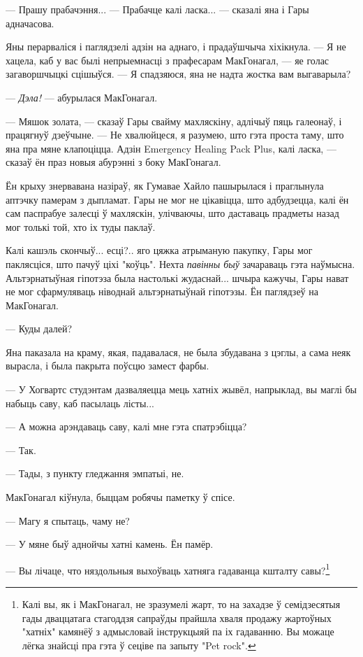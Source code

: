 --- Прашу прабачэння... --- Прабачце калі ласка... --- сказалі яна і Гары адначасова. 

Яны перарваліся і паглядзелі адзін на аднаго, і прадаўшчыча хіхікнула. --- Я
не хацела, каб у вас былі непрыемнасці з прафесарам МакГонагал, --- яе голас
загаворшчыцкі сцішыўся. --- Я спадзяюся, яна не надта жостка вам выгаварыла?

--- \emph{Дэла!} --- абурылася МакГонагал.

--- Мяшок золата, --- сказаў Гары свайму махляскіну, адлічыў пяць галеонаў, і 
працягнуў дзеўчыне. --- Не хвалюйцеся, я разумею, што гэта проста таму, што яна
пра мяне клапоціцца. Адзін Emergency Healing Pack Plus, калі ласка, --- сказаў ён праз новыя абурэнні
з боку МакГонагал.

Ён крыху знервавана назіраў, як Гумавае Хайло пашырылася і праглынула аптэчку
памерам з дыпламат. Гары не мог не цікавіцца, што адбудзецца, калі ён сам
паспрабуе залесці ў махляскін, улічваючы, што даставаць прадметы назад мог 
толькі той, хто іх туды паклаў. 

Калі кашэль скончыў... есці?.. яго цяжка атрыманую пакупку, Гары мог 
паклясціся, што пачуў ціхі "коўць". Нехта \emph{павінны быў} зачараваць гэта
наўмысна. Альтэрнатыўная гіпотэза была настолькі жудаснай... шчыра кажучы, Гары
нават не мог сфармуляваць ніводнай альтэрнатыўнай гіпотэзы. Ён паглядзеў на
МакГонагал.

--- Куды далей?

Яна паказала на краму, якая, падавалася, не была збудавана з цэглы, а сама неяк
вырасла, і была пакрыта поўсцю замест фарбы. 

--- У Хогвартс студэнтам дазваляецца мець хатніх жывёл, напрыклад, вы маглі бы
набыць саву, каб пасылаць лісты...

--- А можна арэндаваць саву, калі мне гэта спатрэбіцца?

--- Так.

--- Тады, з пункту гледжання эмпатыі, не.

МакГонагал кіўнула, быццам робячы паметку ў спісе.

--- Магу я спытаць, чаму не?

--- У мяне быў аднойчы хатні камень. Ён памёр.

--- Вы лічаце, что няздольныя выхоўваць хатняга гадаванца кшталту савы?\footnote{{}Калі вы, як і МакГонагал, 
не зразумелі жарт, то на захадзе ў 
семідзесятыя гады дваццатага стагоддзя сапраўды прайшла хваля продажу жартоўных 
"хатніх" камянёў з адмысловай інструкцыяй па іх гадаванню.
Вы можаце лёгка знайсці пра гэта ў сеціве 
па запыту "Pet rock".}

